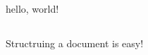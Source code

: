 \documentclass{article}
\begin{document}
  \section{}
  hello, world!
  \subsection{}
Structruing a document is easy!
  \paragraph{}
\end{document}
